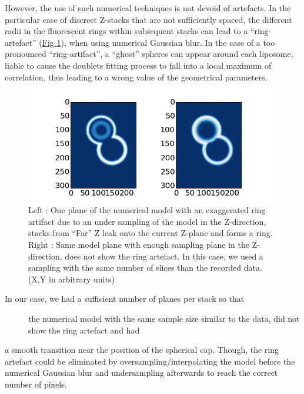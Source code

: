 \documentclass[A4paperpaper,11pt,english]{sphinxmanual}
\begin{document}
However, the use of such numerical techniques is not devoid of artefacts.  In the particular case of
discreet Z-stacks that are not sufficiently spaced, the different radii in the
fluorescent rings within subsequent stacks can lead to a ``ring-artefact'' (\hyperref[parts/part4:ring-artifact]{Fig  \ref*{parts/part4:ring-artifact}}), when using numerical Gaussian blur. In the case of a too
pronounced ``ring-artifact'', a ``ghost'' spheres can appear around each liposome,
liable to cause the doublets fitting process to fall into a local
maximum of correlation, thus leading to a wrong value of the geometrical
parameters.
\begin{figure}[htbp]
\centering
\capstart

\includegraphics[width=0.700\linewidth]{ring_artifact.png}
\caption{Left : One plane of the numerical model with an exaggerated ring artifact due
to an under sampling of the model in the Z-direction, stacks from ``Far'' Z
leak onto the current Z-plane and forms a ring.  Right : Same model plane  with enough sampling plane in the Z-direction, does not show the ring
artefact. In this case, we used a sampling with the same number of slices than
the recorded data. (X,Y in arbitrary units)}\label{parts/part4:ring-artifact}\end{figure}
\begin{description}
\item[{In our case, we had a sufficient number of planes per stack so that}] \leavevmode
the numerical model with the same sample size similar to the data, did not show the ring artefact and had

\end{description}

a smooth transition near the position of the spherical cap. Though, the ring
artefact could be eliminated by oversampling/interpolating the model before the
numerical Gaussian blur and undersampling afterwards to reach the correct number of
pixels.
\end{document}
